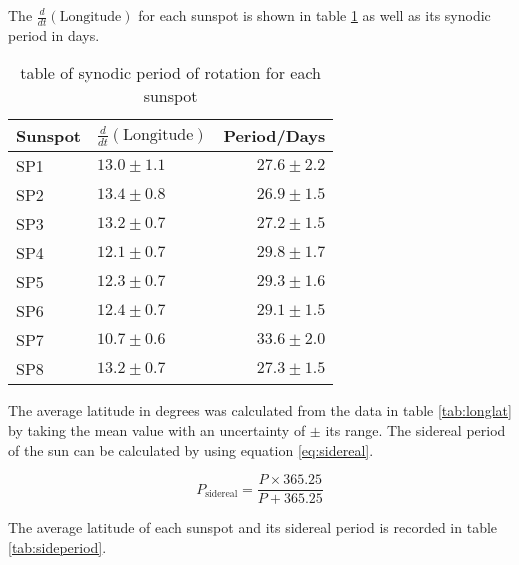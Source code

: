 \documentclass[10pt]{article}
\begin{document}
\noindent The $\frac{d}{dt} ( \text{Longitude} )$ for each sunspot is shown in table \ref{tab:period} as well as its synodic period in days.

\begin{table}[H]
	\centering
	\caption{table of synodic period of rotation for each sunspot}
	\begin{tabularx}{0.6\textwidth}{XXr}
		\toprule
		Sunspot &  $\frac{d}{dt} ( \text{Longitude} )$ & Period/Days \\
		\midrule
		SP1 & $ 13.0 \pm  1.1$ & $ 27.6 \pm  2.2$ \\
		SP2 & $ 13.4 \pm  0.8$ & $ 26.9 \pm  1.5$ \\
		SP3 & $ 13.2 \pm  0.7$ & $ 27.2 \pm  1.5$ \\
		SP4 & $ 12.1 \pm  0.7$ & $ 29.8 \pm  1.7$ \\
		SP5 & $ 12.3 \pm  0.7$ & $ 29.3 \pm  1.6$ \\
		SP6 & $ 12.4 \pm  0.7$ & $ 29.1 \pm  1.5$ \\
		SP7 & $ 10.7 \pm  0.6$ & $ 33.6 \pm  2.0$ \\
		SP8 & $ 13.2 \pm  0.7$ & $ 27.3 \pm  1.5$ \\
		\bottomrule
	\end{tabularx}
	\label{tab:period}
\end{table}

\noindent The average latitude in degrees was calculated from the data in table \ref{tab:longlat} by taking the mean value with an uncertainty of $\pm$ its range. The sidereal period of the sun can be calculated by using equation \ref{eq:sidereal}.

\begin{equation}
	P_{\text{sidereal}} = \frac{P \times 365.25}{P + 365.25}
	\label{eq:sidereal}
\end{equation}

\noindent The average latitude of each sunspot and its sidereal period is recorded in table \ref{tab:sideperiod}.
\end{document}
